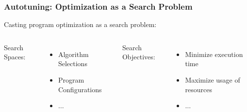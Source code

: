\documentclass[10pt, compress, aspectratio=169]{beamer}
\begin{document}
\begin{frame}
    \frametitle{Autotuning: Optimization as a Search Problem}
    Casting program optimization as a \alert{search problem}:

    \begin{columns}[T,onlytextwidth]
        \alert{Search Spaces}:
        \begin{itemize}
            \item Algorithm Selections
            \item Program Configurations
            \item $\dots$
        \end{itemize}

        \alert{Search Objectives}:
        \begin{itemize}
            \item Minimize \alert{execution time}
            \item Maximize \alert{usage of resources}
            \item $\dots$
        \end{itemize}
    \end{columns}

    \vfill
\end{frame}

%
%
\end{document}
